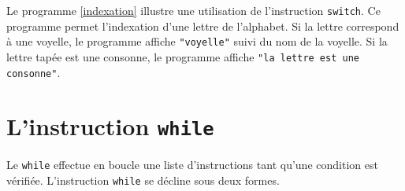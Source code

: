 \documentclass[a4paper,11pt]{book}
\theoremstyle{definition}
\begin{document}
Le programme \ref{indexation} illustre une utilisation de l'instruction \texttt{switch}. Ce programme permet l'indexation d'une lettre de l'alphabet. Si la lettre correspond à une voyelle, le programme affiche \texttt{"voyelle"} suivi du nom de la voyelle. Si la lettre tapée est une consonne, le programme affiche \texttt{"la lettre est une consonne"}.



\section{L'instruction \texttt{while}}
Le \texttt{while} effectue en boucle une liste d'instructions tant qu'une condition est vérifiée. L'instruction \texttt{while} se décline sous deux formes.
\end{document}
